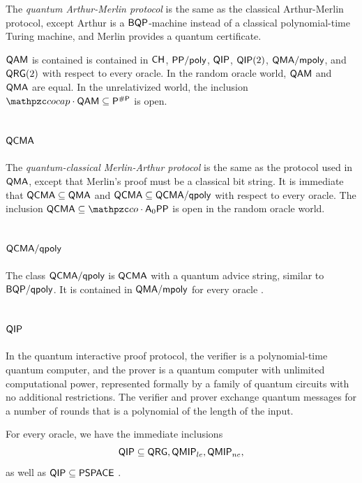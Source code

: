 The \textit{quantum Arthur-Merlin protocol} is the same as the classical 
Arthur-Merlin protocol, except Arthur is a $\mathsf{BQP}$-machine instead of a 
classical polynomial-time Turing machine, and Merlin provides a quantum 
certificate.

$\mathsf{QAM}$ is contained is contained in $\mathsf{CH}$, $\mathsf{PP}/\mathsf{poly}$, 
$\mathsf{QIP}$, $\mathsf{QIP}(2)$, $\mathsf{QMA}/\mathsf{mpoly}$, and $\mathsf{QRG}(2)$ with 
respect to every oracle. In the random oracle world, $\mathsf{QAM}$ and $\mathsf{QMA}$
are equal. In the unrelativized world, the inclusion 
$\cocap\cdot\msf{QAM}\subseteq\sP^{\#\sP}$ is open.

\subsection{$\mathsf{QCMA}$}

The \textit{quantum-classical Merlin-Arthur protocol} is the same as the 
protocol used in $\mathsf{QMA}$, except that Merlin's proof must be a classical bit
string. It is immediate that $\mathsf{QCMA}\subseteq\mathsf{QMA}$ and 
$\mathsf{QCMA}\subseteq\mathsf{QCMA}/\mathsf{qpoly}$ with respect to every oracle. The 
inclusion $\msf{QCMA}\subseteq\cco\cdot\msf{A}_0\msf{PP}$ is open in the random 
oracle world.

\subsection{$\mathsf{QCMA}/\mathsf{qpoly}$}

The class $\mathsf{QCMA}/\mathsf{qpoly}$ is $\mathsf{QCMA}$ with a quantum advice 
string, similar to $\mathsf{BQP}/\mathsf{qpoly}$. It is contained in 
$\mathsf{QMA}/\mathsf{mpoly}$ for every oracle \cite{aaronson2014full}.

\subsection{$\mathsf{QIP}$}

In the quantum interactive proof protocol, the verifier is a polynomial-time 
quantum computer, and the prover is a quantum computer with unlimited 
computational power, represented formally by a family of quantum circuits with 
no additional restrictions. The verifier and prover exchange quantum messages 
for a number of rounds that is a polynomial of the length of the input.

For every oracle, we have the immediate inclusions
\[
\mathsf{QIP}\subseteq\mathsf{QRG},\mathsf{QMIP}_{le},\mathsf{QMIP}_{ne},
\]
as well as $\mathsf{QIP}\subseteq\mathsf{PSPACE}$ \cite{jain2010qip}.

